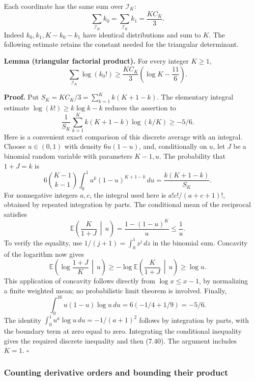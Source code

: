 \documentclass[
  11pt,
  a4paper,
]{article}
\begin{document}
Each coordinate has the same sum over \(\mathcal I_K\): \[
\sum_{\mathcal I_K}k_0=\sum_{\mathcal I_K}k_1=\frac{KC_K}{3}.
\] Indeed \(k_0,k_1,K-k_0-k_1\) have identical distributions and sum to
\(K\). The following estimate retains the constant needed for the
triangular determinant.

\textbf{Lemma (triangular factorial product).} For every integer
\(K\ge1\), \[
\sum_{\mathcal I_K}\log(k_0!)
\ge\frac{KC_K}{3}\left(\log K-\frac{11}{6}\right). \tag{7.40}
\]

\textbf{Proof.} Put \(S_K=KC_K/3=\sum_{k=1}^Kk(K+1-k)\). The elementary
integral estimate \(\log(k!)\ge k\log k-k\) reduces the assertion to \[
\frac1{S_K}\sum_{k=1}^Kk(K+1-k)\log(k/K)\ge-5/6.
\] Here is a convenient exact comparison of this discrete average with
an integral. Choose \(u\in(0,1)\) with density \(6u(1-u)\), and,
conditionally on \(u\), let \(J\) be a binomial random variable with
parameters \(K-1,u\). The probability that \(1+J=k\) is \[
6\binom{K-1}{k-1}\int_0^1u^k(1-u)^{K+1-k}\,du
=\frac{k(K+1-k)}{S_K}.
\] For nonnegative integers \(a,c\), the integral used here is
\(a!c!/(a+c+1)!\), obtained by repeated integration by parts. The
conditional mean of the reciprocal satisfies \[
\mathbb E\left(\frac K{1+J}\,\middle|\,u\right)
=\frac{1-(1-u)^K}{u}\le\frac1u.
\] To verify the equality, use \(1/(j+1)=\int_0^1z^j\,dz\) in the
binomial sum. Concavity of the logarithm now gives \[
\mathbb E\left(\log\frac{1+J}{K}\,\middle|\,u\right)
\ge-\log\mathbb E\left(\frac K{1+J}\,\middle|\,u\right)
\ge\log u.
\] This application of concavity follows directly from
\(\log x\le x-1\), by normalizing a finite weighted mean; no
probabilistic limit theorem is involved. Finally, \[
\int_0^16u(1-u)\log u\,du
=6(-1/4+1/9)=-5/6.
\] The identity \(\int_0^1u^a\log u\,du=-1/(a+1)^2\) follows by
integration by parts, with the boundary term at zero equal to zero.
Integrating the conditional inequality gives the required discrete
inequality and then (7.40). The argument includes \(K=1\). \(\square\)

\subsubsection{Counting derivative orders and bounding their
product}\label{counting-derivative-orders-and-bounding-their-product}
\end{document}
